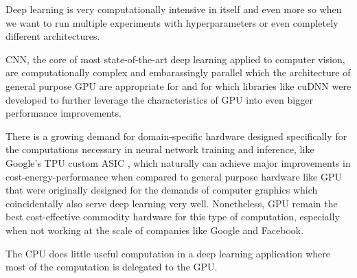 Deep learning is very computationally intensive in itself and even more so when we want to run multiple experiments with hyperparameters or even completely different architectures.

\ac{CNN}, the core of most state-of-the-art deep learning applied to computer vision, are computationally complex and embarassingly parallel \cite{chang2017} which the architecture of general purpose \ac{GPU} are appropriate for \cite{gpu} and for which libraries like cuDNN \cite{cudnn} were developed to further leverage the characteristics of \ac{GPU} into even bigger performance improvements.

There is a growing demand for domain-specific hardware designed specifically for the computations necessary in neural network training and inference, like Google's TPU custom ASIC \cite{tpu}, which naturally can achieve major improvements in cost-energy-performance when compared to general purpose hardware like \ac{GPU} that were originally designed for the demands of computer graphics which coincidentally also serve deep learning very well. Nonetheless, \ac{GPU} remain the best cost-effective commodity hardware for this type of computation, especially when not working at the scale of companies like Google and Facebook.

The CPU does little useful computation in a deep learning application where most of the computation is delegated to the GPU.


